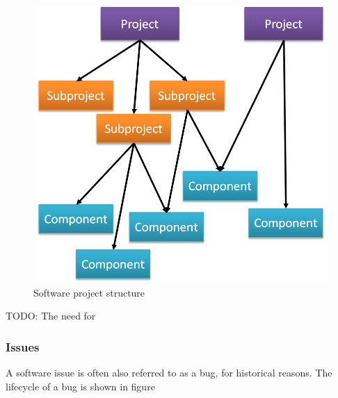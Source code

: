 \documentclass[10pt,a4paper]{article}
\begin{document}
\begin{figure}[h]
\centering
\includegraphics[scale=0.6]{fig/project_structure.png} 
\caption{Software project structure}
\label{fig:project_structure}
\end{figure}

TODO: The need for 


\subsubsection{Issues}
A software issue is often also referred to as a bug, for historical reasons.
The lifecycle of a bug is shown in figure 
\end{document}
